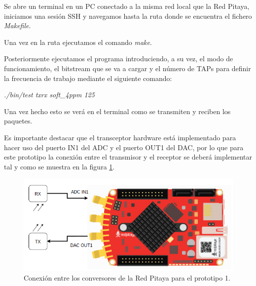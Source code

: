 Se abre un terminal en un PC conectado a la misma red local que la Red Pitaya, 
iniciamos una sesión SSH y navegamos hasta la ruta donde se encuentra el fichero
\textit{Makefile}. 

Una vez en la ruta ejecutamos el comando \textit{make}.

Posteriormente ejecutamos el programa introduciendo, a su vez, el modo de funcionamiento,
el bitstream que se va a cargar y el número de TAPs para definir la frecuencia de trabajo
mediante el siguiente comando:

\textit{./bin/test txrx soft\_4ppm 125}

Una vez hecho esto se verá en el terminal como se transmiten y reciben los paquetes.

Es importante destacar que el transceptor hardware está implementado para hacer uso del
puerto IN1 del ADC y el puerto OUT1 del DAC, por lo que para este prototipo la conexión
entre el transmisor y el receptor se deberá implementar tal y como se muestra en la
figura \ref{conex}.

\begin{figure}[ht]
    \centering
    \includegraphics[scale=0.50]{./figuras/conexion_pitaya.png}
    \caption{\small{Conexión entre los conversores de la Red Pitaya para el prototipo 1.}}
    \label{conex}%
\end{figure}

\chapterend